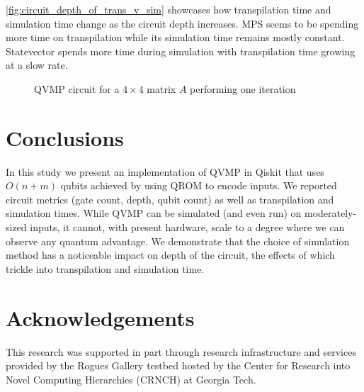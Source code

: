 \documentclass[conference]{IEEEtran}
\begin{document}
\cref{fig:circuit_depth_of_trans_v_sim} showcases how transpilation time and
simulation time change as the circuit depth increases.  MPS seems to be spending
more time on transpilation while its simulation time remains mostly constant.
Statevector spends more time during simulation with transpilation time growing
at a slow rate.

\begin{figure}
  \centering
  \scalebox{1}{}
  \caption{QVMP circuit for a $4 \times 4$ matrix $A$ performing one iteration}
  \label{fig:qvmp_oracle_4x4}
\end{figure}

\section{Conclusions}

In this study we present an implementation of QVMP in Qiskit that uses $O(n+m)$
qubits achieved by using QROM to encode inputs. We reported circuit metrics
(gate count, depth, qubit count) as well as transpilation and simulation times.
While QVMP can be simulated (and even run) on moderately-sized inputs, it
cannot, with present hardware, scale to a degree where we can observe any
quantum advantage. We demonstrate that the choice of simulation method has a
noticeable impact on depth of the circuit, the effects of which trickle into
transpilation and simulation time.

\section*{Acknowledgements}

This research was supported in part through research infrastructure and services
provided by the Rogues Gallery testbed \cite{young:2019:rg-exp-insights} hosted
by the Center for Research into Novel Computing Hierarchies (CRNCH) at Georgia
Tech.






\end{document}
